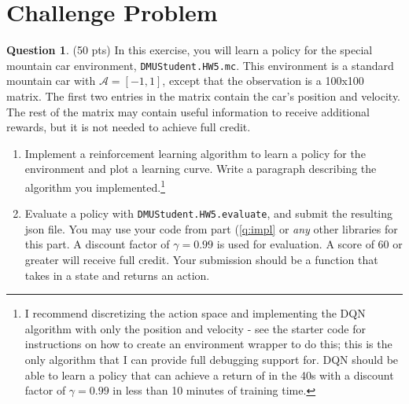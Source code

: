 \documentclass{article}
\theoremstyle{definition}
\newtheorem{question}[thm]{Question}
\begin{document}
\section{Challenge Problem}

\begin{question}
    (50 pts) In this exercise, you will learn a policy for the special mountain car environment, \texttt{DMUStudent.HW5.mc}. This environment is a standard mountain car with $\mathcal{A}=[-1, 1]$, except that the observation is a 100x100 matrix. The first two entries in the matrix contain the car's position and velocity. The rest of the matrix may contain useful information to receive additional rewards, but it is not needed to achieve full credit.
    \begin{enumerate}[label=\alph*)]
        \item Implement a reinforcement learning algorithm to learn a policy for the environment and plot a learning curve. Write a paragraph describing the algorithm you implemented.\footnote{I recommend discretizing the action space and implementing the DQN algorithm with only the position and velocity - see the starter code for instructions on how to create an environment wrapper to do this; this is the only algorithm that I can provide full debugging support for. DQN should be able to learn a policy that can achieve a return of in the 40s with a discount factor of $\gamma=0.99$ in less than 10 minutes of training time.}\label{q:impl}
        \item Evaluate a policy with \texttt{DMUStudent.HW5.evaluate}, and submit the resulting json file. You may use your code from part (\ref{q:impl} or \emph{any} other libraries for this part. A discount factor of $\gamma=0.99$ is used for evaluation. A score of 60 or greater will receive full credit. Your submission should be a function that takes in a state and returns an action.
    \end{enumerate}
\end{question}
\end{document}
